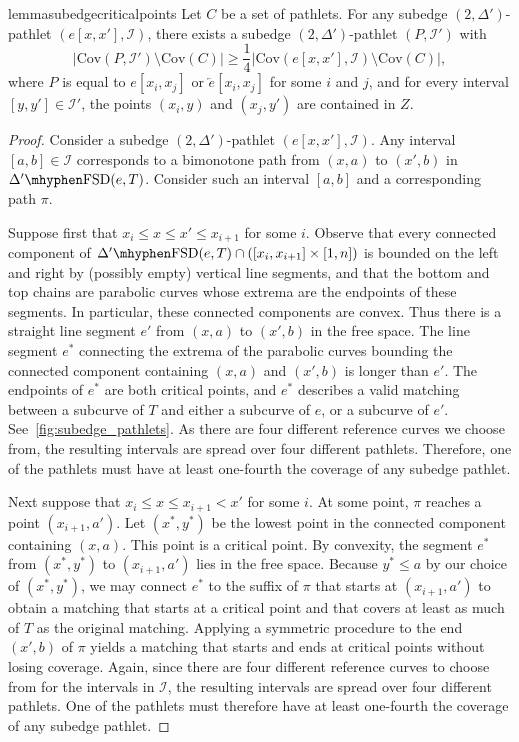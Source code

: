 \documentclass[a4paper,UKenglish,cleveref,thm-restate,notab]{lipics-v2021}
\newcommand{\FSD}[1][\Delta'] {\ensuremath{#1}\mhyphen\mathrm{FSD}}
\newcommand{\I}{\mathcal{I}}
\newcommand{\rev}{\overleftarrow}
\newcommand{\Cov}{\ensuremath{\mathrm{Cov}}}
\begin{document}
    \begin{restatable}{lemma}{subedgecriticalpoints}
     \label{lem:subedge_critical_points}
         Let $C$ be a set of pathlets.
        For any subedge $(2, \Delta')$-pathlet $(e[x, x'], \I)$, there exists a subedge $(2, \Delta')$-pathlet $(P, \I')$ with
        \[
            | \Cov(P, \I') \setminus \Cov(C) | \geq \frac{1}{4} | \Cov(e[x, x'], \I) \setminus \Cov(C) |,
        \]
        where $P$ is equal to $e[x_i, x_j]$ or $\rev{e}[x_i, x_j]$ for some $i$ and $j$, and for every interval $[y, y'] \in \I'$, the points $(x_i, y)$ and $(x_j, y')$ are contained in $Z$.        
    \end{restatable}
    \begin{proof}
        Consider a subedge $(2, \Delta')$-pathlet $(e[x, x'], \I)$.
        Any interval $[a, b] \in \I$ corresponds to a bimonotone path from $(x, a)$ to $(x', b)$ in $\FSD(e, T)$.
        Consider such an interval $[a, b]$ and a corresponding path $\pi$.
        
        Suppose first that $x_i \leq x \leq x' \leq x_{i+1}$ for some $i$.
        Observe that every connected component of $\FSD(e, T) \cap ([x_i, x_{i+1}] \times [1, n])$ is bounded on the left and right by (possibly empty) vertical line segments, and that the bottom and top chains are parabolic curves whose extrema are the endpoints of these segments.
        In particular, these connected components are convex.
        Thus there is a straight line segment $e'$ from $(x, a)$ to $(x', b)$ in the free space.
        The line segment $e^*$ connecting the extrema of the parabolic curves bounding the connected component containing $(x, a)$ and $(x', b)$ is longer than $e'$.
        The endpoints of $e^*$ are both critical points, and $e^*$ describes a valid matching between a subcurve of $T$ and either a subcurve of $e$, or a subcurve of $e'$.
        See~\cref{fig:subedge_pathlets}.
        As there are four different reference curves we choose from, the resulting intervals are spread over four different pathlets.
        Therefore, one of the pathlets must have at least one-fourth the coverage of any subedge pathlet.
        
        Next suppose that $x_i \leq x \leq x_{i+1} < x'$ for some $i$.
        At some point, $\pi$ reaches a point $(x_{i+1}, a')$.
        Let $(x^*, y^*)$ be the lowest point in the connected component containing $(x, a)$.
        This point is a critical point.
        By convexity, the segment $e^*$ from $(x^*, y^*)$ to $(x_{i+1}, a')$ lies in the free space.
        Because $y^* \leq a$ by our choice of $(x^*, y^*)$, we may connect $e^*$ to the suffix of $\pi$ that starts at $(x_{i+1}, a')$ to obtain a matching that starts at a critical point and that covers at least as much of $T$ as the original matching.
        Applying a symmetric procedure to the end $(x', b)$ of $\pi$ yields a matching that starts and ends at critical points without losing coverage.
        Again, since there are four different reference curves to choose from for the intervals in $\I$, the resulting intervals are spread over four different pathlets.
        One of the pathlets must therefore have at least one-fourth the coverage of any subedge pathlet.
    \end{proof}
\end{document}
